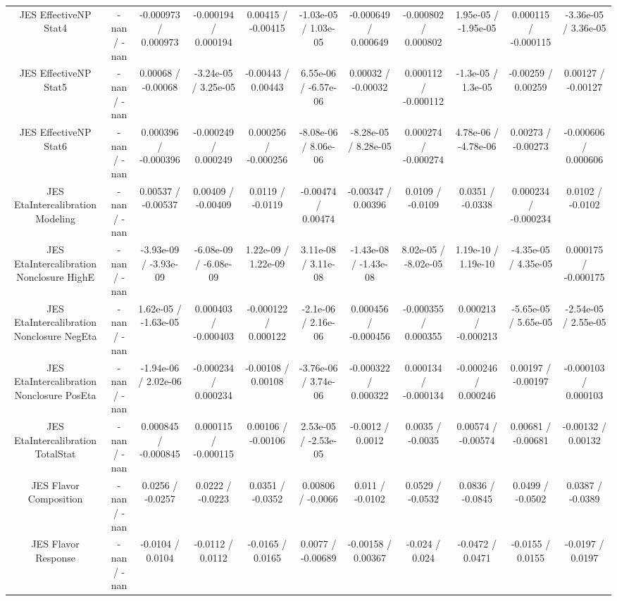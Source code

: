 \begin{table}[htbp]
\begin{center}
\begin{tabular}{|c|c|c|c|c|c|c|c|c|c|c|}
  JES EffectiveNP Stat4 & -nan / -nan & -0.000973 / 0.000973 & -0.000194 / 0.000194 & 0.00415 / -0.00415 & -1.03e-05 / 1.03e-05 & -0.000649 / 0.000649 & -0.000802 / 0.000802 & 1.95e-05 / -1.95e-05 & 0.000115 / -0.000115 & -3.36e-05 / 3.36e-05 \\ 
  JES EffectiveNP Stat5 & -nan / -nan & 0.00068 / -0.00068 & -3.24e-05 / 3.25e-05 & -0.00443 / 0.00443 & 6.55e-06 / -6.57e-06 & 0.00032 / -0.00032 & 0.000112 / -0.000112 & -1.3e-05 / 1.3e-05 & -0.00259 / 0.00259 & 0.00127 / -0.00127 \\ 
  JES EffectiveNP Stat6 & -nan / -nan & 0.000396 / -0.000396 & -0.000249 / 0.000249 & 0.000256 / -0.000256 & -8.08e-06 / 8.06e-06 & -8.28e-05 / 8.28e-05 & 0.000274 / -0.000274 & 4.78e-06 / -4.78e-06 & 0.00273 / -0.00273 & -0.000606 / 0.000606 \\ 
  JES EtaIntercalibration Modeling & -nan / -nan & 0.00537 / -0.00537 & 0.00409 / -0.00409 & 0.0119 / -0.0119 & -0.00474 / 0.00474 & -0.00347 / 0.00396 & 0.0109 / -0.0109 & 0.0351 / -0.0338 & 0.000234 / -0.000234 & 0.0102 / -0.0102 \\ 
  JES EtaIntercalibration Nonclosure HighE & -nan / -nan & -3.93e-09 / -3.93e-09 & -6.08e-09 / -6.08e-09 & 1.22e-09 / 1.22e-09 & 3.11e-08 / 3.11e-08 & -1.43e-08 / -1.43e-08 & 8.02e-05 / -8.02e-05 & 1.19e-10 / 1.19e-10 & -4.35e-05 / 4.35e-05 & 0.000175 / -0.000175 \\ 
  JES EtaIntercalibration Nonclosure NegEta & -nan / -nan & 1.62e-05 / -1.63e-05 & 0.000403 / -0.000403 & -0.000122 / 0.000122 & -2.1e-06 / 2.16e-06 & 0.000456 / -0.000456 & -0.000355 / 0.000355 & 0.000213 / -0.000213 & -5.65e-05 / 5.65e-05 & -2.54e-05 / 2.55e-05 \\ 
  JES EtaIntercalibration Nonclosure PosEta & -nan / -nan & -1.94e-06 / 2.02e-06 & -0.000234 / 0.000234 & -0.00108 / 0.00108 & -3.76e-06 / 3.74e-06 & -0.000322 / 0.000322 & 0.000134 / -0.000134 & -0.000246 / 0.000246 & 0.00197 / -0.00197 & -0.000103 / 0.000103 \\ 
  JES EtaIntercalibration TotalStat & -nan / -nan & 0.000845 / -0.000845 & 0.000115 / -0.000115 & 0.00106 / -0.00106 & 2.53e-05 / -2.53e-05 & -0.0012 / 0.0012 & 0.0035 / -0.0035 & 0.00574 / -0.00574 & 0.00681 / -0.00681 & -0.00132 / 0.00132 \\ 
  JES Flavor Composition & -nan / -nan & 0.0256 / -0.0257 & 0.0222 / -0.0223 & 0.0351 / -0.0352 & 0.00806 / -0.0066 & 0.011 / -0.0102 & 0.0529 / -0.0532 & 0.0836 / -0.0845 & 0.0499 / -0.0502 & 0.0387 / -0.0389 \\ 
  JES Flavor Response & -nan / -nan & -0.0104 / 0.0104 & -0.0112 / 0.0112 & -0.0165 / 0.0165 & 0.0077 / -0.00689 & -0.00158 / 0.00367 & -0.024 / 0.024 & -0.0472 / 0.0471 & -0.0155 / 0.0155 & -0.0197 / 0.0197 \\ 

\end{tabular}
\end{center}
\end{table}

